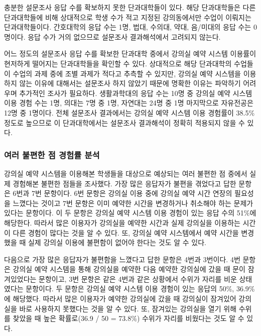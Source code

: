 \documentclass[11pt,a4paper]{article}
\begin{document}
충분한 설문조사 응답 수를 확보하지 못한 단과대학들이 있다. 해당 단과대학들은
다른 단과대학들에 비해 상대적으로 학생 수가 적고 지정된 강의동에서만 수업이
이뤄지는 단과대학들이다. 간호대학의 응답 수는 1명, 법대, 수의대, 약대,
음/미대의 응답 수는 0명이다. 응답 수가 거의 없으므로 설문조사 결과해석에서
고려되지 않는다.

어느 정도의 설문조사 응답 수를 확보한 단과대학 중에서 강의실 예약 시스템
이용률이 현저하게 떨어지는 단과대학들을 확인할 수 있다. 상대적으로 해당
단과대학의 수업들이 수업의 과제 중에 조별 과제가 적다고 추측할 수 있지만,
강의실 예약 시스템을 이용하지 않는 이유에 대해서는 설문조사 하지 않았기 때문에
명확한 이유는 파악하기 어려우며 추가적인 조사가 필요하다. 생활과학대의 응답
수는 10명 중 강의실 예약 시스템 이용 경험 수는 1명, 의대는 7명 중 1명, 자연대는
24명 중 1명 마지막으로 자유전공은 12명 중 1명이다. 전체 설문조사 결과에서는
강의실 예약 시스템 이용 경험률이 38.5\% 정도로 높으므로 이 단과대학에서는
설문조사 결과해석이 정확히 적용되지 않을 수 있다.

\subsubsection{여러 불편한 점 경험률 분석}
강의실 예약 시스템을 이용해본 학생들을 대상으로 예상되는 여러 불편한 점 중에서
실제 경험해본 불편한 점들을 조사했다. 가장 많은 응답자가 불편을 겪었다고 답한
문항은 6번과 7번 문항이다. 6번 문항은 강의실 이용 중에 강의실 예약 시간 연장의
필요성을 느꼈다는 것이고 7번 문항은 이미 예약한 시간을 변경하거나 취소해야 하는
문제가 있다는 문항이다. 이 두 문항은 강의실 예약 시스템 이용 경험이 있는 응답
수의 51\%에 해당한다. 따라서 많은 이용자가 강의실을 예약한 시간과 실제 강의실을
이용하는 시간이 다른 경험이 많다는 것을 알 수 있다. 또, 강의실 예약 시스템에서
예약 시간을 변경했을 때 실제 강의실 이용에 불편함이 없어야 한다는 것도 알 수
있다.

다음으로 가장 많은 응답자가 불편함을 느꼈다고 답한 문항은 4번과 3번이다. 4번
문항은 강의실 예약 시스템을 통해 강의실을 예약한 다음 예약한 강의실에 갔을 때
문이 잠겨있었다는 문항이고, 3번 문항은 같은 4번과 같은 상황에서 수위가 자리를
비운 상태였다는 문항이다. 두 문항은 강의실 예약 시스템 이용 경험이 있는 응답의
50\%, 36.9\%에 해당했다. 따라서 많은 이용자가 예약한 강의실에 갔을 때 강의실이
잠겨있어 강의실을 바로 사용하지 못했다는 것을 알 수 있다. 또, 잠겨있는 강의실을
열기 위해 수위를 찾았을 때 높은 확률로(36.9 / 50 = 73.8\%) 수위가 자리를
비웠다는 것도 알 수 있다.
\end{document}
